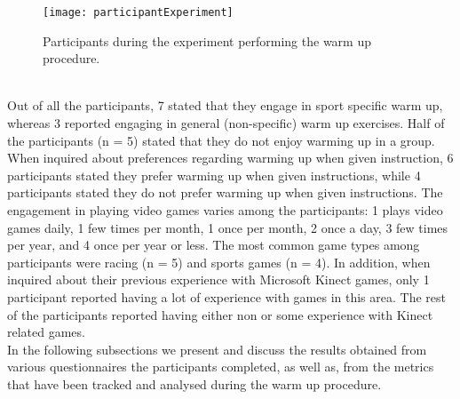 \begin{figure}[h]
    \centering
    \texttt{[image: participantExperiment]}
    \caption{Participants during the experiment performing the warm up procedure.}
    \label{fig:participants}
\end{figure}\\
Out of all the participants, 7 stated that they engage in sport specific warm up, whereas 3 reported engaging in general  (non-specific) warm up exercises. Half of the participants (n = 5) stated that they do not enjoy warming up in a group. When inquired about preferences regarding warming up when given instruction, 6 participants stated they prefer warming up when given instructions, while 4 participants stated they do not prefer warming up when given instructions. The engagement in playing video games varies among the participants: 1 plays video games daily, 1 few times per month, 1 once per month, 2 once a day, 3 few times per year, and 4 once per year or less. The most common game types among participants were racing (n = 5) and sports games (n = 4). In addition, when inquired about their previous experience with Microsoft Kinect games, only 1 participant reported having a lot of experience with games in this area. The rest of the participants reported having either non or some experience with Kinect related games.\\In the following subsections we present and discuss the results obtained from various questionnaires the participants completed, as well as, from the metrics that have been tracked and analysed during the warm up procedure.\pagebreak
